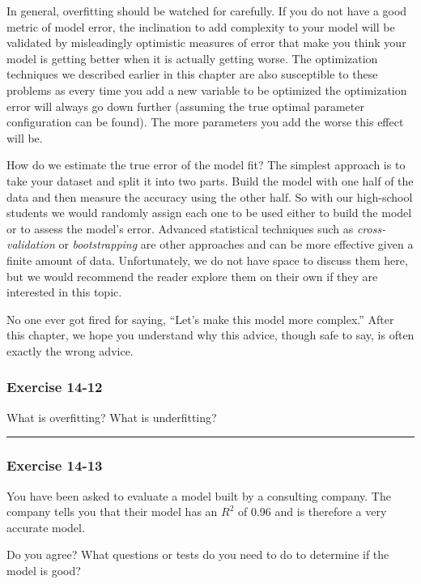 \documentclass[]{memoir}
\begin{document}
In general, overfitting should be watched for carefully. If you do not
have a good metric of model error, the inclination to add complexity to
your model will be validated by misleadingly optimistic measures of
error that make you think your model is getting better when it is
actually getting worse. The optimization techniques we described earlier
in this chapter are also susceptible to these problems as every time you
add a new variable to be optimized the optimization error will always go
down further (assuming the true optimal parameter configuration can be
found). The more parameters you add the worse this effect will be.

How do we estimate the true error of the model fit? The simplest
approach is to take your dataset and split it into two parts. Build the
model with one half of the data and then measure the accuracy using the
other half. So with our high-school students we would randomly assign
each one to be used either to build the model or to assess the model's
error. Advanced statistical techniques such as \emph{cross-validation}
or \emph{bootstrapping} are other approaches and can be more effective
given a finite amount of data. Unfortunately, we do not have space to
discuss them here, but we would recommend the reader explore them on
their own if they are interested in this topic.

No one ever got fired for saying, ``Let's make this model more
complex.'' After this chapter, we hope you understand why this advice,
though safe to say, is often exactly the wrong advice.

\subsubsection{Exercise 14-12}

What is overfitting? What is underfitting?

\begin{center}\rule{3in}{0.4pt}\end{center}

\subsubsection{Exercise 14-13}

You have been asked to evaluate a model built by a consulting company.
The company tells you that their model has an $R^2$ of 0.96 and is
therefore a very accurate model.

Do you agree? What questions or tests do you need to do to determine if
the model is good?
\end{document}
